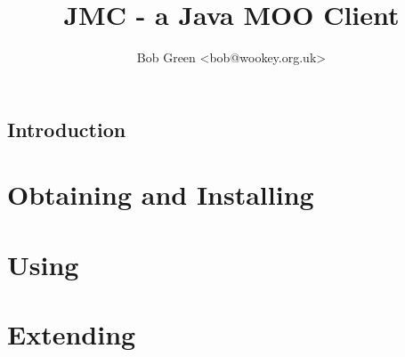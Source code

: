 \documentclass[12pt]{book}
\title{JMC - a Java MOO Client}
\author{Bob Green <bob@wookey.org.uk>}
\begin{document}
\maketitle
\tableofcontents
\chapter{Introduction}
\part{Obtaining and Installing}
\part{Using}
\part{Extending}
\end{document}
